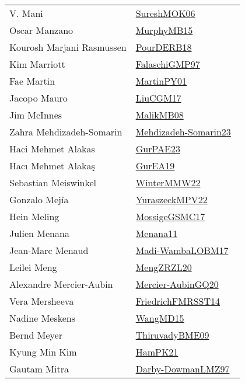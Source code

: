 {\begin{longtable}{p{4cm}p{20cm}}
V. Mani & \href{works/SureshMOK06.pdf}{SureshMOK06}~\cite{SureshMOK06}\\
Oscar Manzano & \href{works/MurphyMB15.pdf}{MurphyMB15}~\cite{MurphyMB15}\\
Kourosh Marjani Rasmussen & \href{works/PourDERB18.pdf}{PourDERB18}~\cite{PourDERB18}\\
Kim Marriott & \href{works/FalaschiGMP97.pdf}{FalaschiGMP97}~\cite{FalaschiGMP97}\\
Fae Martin & \href{works/MartinPY01.pdf}{MartinPY01}~\cite{MartinPY01}\\
Jacopo Mauro & \href{works/LiuCGM17.pdf}{LiuCGM17}~\cite{LiuCGM17}\\
Jim McInnes & \href{works/MalikMB08.pdf}{MalikMB08}~\cite{MalikMB08}\\
Zahra Mehdizadeh{-}Somarin & \href{works/Mehdizadeh-Somarin23.pdf}{Mehdizadeh-Somarin23}~\cite{Mehdizadeh-Somarin23}\\
Haci Mehmet Alakas & \href{works/GurPAE23.pdf}{GurPAE23}~\cite{GurPAE23}\\
Hacı Mehmet Alakaş & \href{works/GurEA19.pdf}{GurEA19}~\cite{GurEA19}\\
Sebastian Meiswinkel & \href{works/WinterMMW22.pdf}{WinterMMW22}~\cite{WinterMMW22}\\
Gonzalo Mej{\'i}a & \href{works/YuraszeckMPV22.pdf}{YuraszeckMPV22}~\cite{YuraszeckMPV22}\\
Hein Meling & \href{works/MossigeGSMC17.pdf}{MossigeGSMC17}~\cite{MossigeGSMC17}\\
Julien Menana & \href{}{Menana11}~\cite{Menana11}\\
Jean{-}Marc Menaud & \href{works/Madi-WambaLOBM17.pdf}{Madi-WambaLOBM17}~\cite{Madi-WambaLOBM17}\\
Leilei Meng & \href{works/MengZRZL20.pdf}{MengZRZL20}~\cite{MengZRZL20}\\
Alexandre Mercier{-}Aubin & \href{works/Mercier-AubinGQ20.pdf}{Mercier-AubinGQ20}~\cite{Mercier-AubinGQ20}\\
Vera Mersheeva & \href{}{FriedrichFMRSST14}~\cite{FriedrichFMRSST14}\\
Nadine Meskens & \href{works/WangMD15.pdf}{WangMD15}~\cite{WangMD15}\\
Bernd Meyer & \href{works/ThiruvadyBME09.pdf}{ThiruvadyBME09}~\cite{ThiruvadyBME09}\\
Kyung Min Kim & \href{works/HamPK21.pdf}{HamPK21}~\cite{HamPK21}\\
Gautam Mitra & \href{works/Darby-DowmanLMZ97.pdf}{Darby-DowmanLMZ97}~\cite{Darby-DowmanLMZ97}\\

\end{longtable}}
